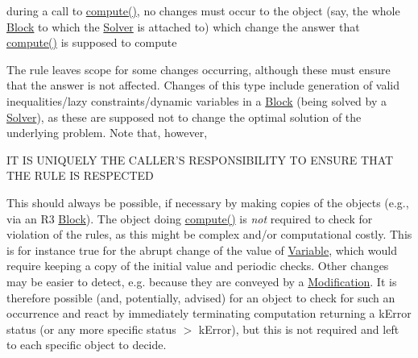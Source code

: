 during a call to \mbox{\hyperlink{class_s_m_spp__di__unipi__it_1_1_thin_compute_interface_a00fd6363d98ea46bcc273842b327d050}{compute()}}, no changes must occur to the object (say, the whole \mbox{\hyperlink{class_s_m_spp__di__unipi__it_1_1_block}{Block}} to which the \mbox{\hyperlink{class_s_m_spp__di__unipi__it_1_1_solver}{Solver}} is attached to) which change the answer that \mbox{\hyperlink{class_s_m_spp__di__unipi__it_1_1_thin_compute_interface_a00fd6363d98ea46bcc273842b327d050}{compute()}} is supposed to compute

The rule leaves scope for some changes occurring, although these must ensure that the answer is not affected. Changes of this type include generation of valid inequalities/lazy constraints/dynamic variables in a \mbox{\hyperlink{class_s_m_spp__di__unipi__it_1_1_block}{Block}} (being solved by a \mbox{\hyperlink{class_s_m_spp__di__unipi__it_1_1_solver}{Solver}}), as these are supposed not to change the optimal solution of the underlying problem. Note that, however, \begin{DoxyVerb}          IT IS UNIQUELY THE CALLER'S RESPONSIBILITY
            TO ENSURE THAT THE RULE IS RESPECTED
\end{DoxyVerb}


This should always be possible, if necessary by making copies of the objects (e.\+g., via an R3 \mbox{\hyperlink{class_s_m_spp__di__unipi__it_1_1_block}{Block}}). The object doing \mbox{\hyperlink{class_s_m_spp__di__unipi__it_1_1_thin_compute_interface_a00fd6363d98ea46bcc273842b327d050}{compute()}} is {\itshape not} required to check for violation of the rules, as this might be complex and/or computational costly. This is for instance true for the abrupt change of the value of \mbox{\hyperlink{class_s_m_spp__di__unipi__it_1_1_variable}{Variable}}, which would require keeping a copy of the initial value and periodic checks. Other changes may be easier to detect, e.\+g. because they are conveyed by a \mbox{\hyperlink{class_s_m_spp__di__unipi__it_1_1_modification}{Modification}}. It is therefore possible (and, potentially, advised) for an object to check for such an occurrence and react by immediately terminating computation returning a k\+Error status (or any more specific status $>$ k\+Error), but this is not required and left to each specific object to decide.

